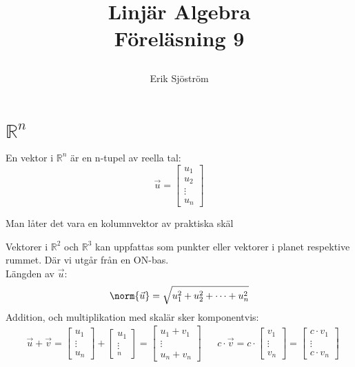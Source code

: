 
\title{
	 Linjär Algebra\\
	 Föreläsning 9
    \author{Erik Sjöström}
}

\maketitle
\section{$\mathbb{R}^n$} %
\label{sec:_r_n_}
En vektor i $\mathbb{R}^n$ är en n-tupel av reella tal:
\[
    \vec{u} = \begin{bmatrix} u_1\\u_2\\\vdots\\u_n \end{bmatrix}
\]
\begin{Rem}
    Man låter det vara en kolumnvektor av praktiska skäl
\end{Rem}
\noindent
Vektorer i $\mathbb{R}^2$ och $\mathbb{R}^3$ kan uppfattas som punkter eller vektorer i planet respektive rummet. Där vi utgår från en ON-bas.\\
Längden av $\vec{u}$:
\[
    \norm{\vec{u}} = \sqrt{u_1^2 + u_2^2 + \cdots + u_n^2}
\]
Addition, och multiplikation med skalär sker komponentvis:
\begin{align*}
&\vec{u} + \vec{v} = \begin{bmatrix} u_1\\\vdots\\u_n \end{bmatrix} + \begin{bmatrix} u_1\\\vdots\\_n \end{bmatrix} = \begin{bmatrix} u_1 + v_1\\\vdots\\u_n + v_n \end{bmatrix}
&& c \cdot \vec{v} = c \cdot \begin{bmatrix} v_1\\\vdots\\v_n \end{bmatrix} = \begin{bmatrix} c \cdot v_1\\\vdots\\c \cdot v_n \end{bmatrix}
\end{align*}
